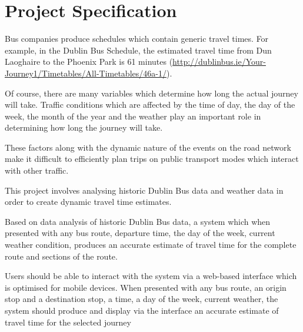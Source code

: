 \documentclass[]{UCD_CS_47360_Report}
\begin{document}
\maketitle


\chapter*{Project Specification}


Bus companies produce schedules which contain generic travel times. For example, in the Dublin Bus Schedule, the estimated travel time from Dun Laoghaire to the Phoenix Park is 61 minutes (\href{http://dublinbus.ie/Your-Journey1/Timetables/All-Timetables/46a-1/}{http://dublinbus.ie/Your-Journey1/Timetables/All-Timetables/46a-1/}).

Of course, there are many variables which determine how long the actual journey will take. Traffic conditions which are affected by the time of day, the day of the week, the month of the year and the weather play an important role in determining how long the journey will take. 

These factors along with the dynamic nature of the events on the road network make it difficult to efficiently plan trips on public transport modes which interact with other traffic. 

This project involves analysing historic Dublin Bus data and weather data in order to create dynamic travel time estimates. 

Based on data analysis of historic Dublin Bus data, a system which when presented with any bus route, departure time, the day of the week, current weather condition, produces an accurate estimate of travel time for the complete route and sections of the route. 

Users should be able to interact with the system via a web-based interface which is optimised for mobile devices. When presented with any bus route, an origin stop and a destination stop, a time, a day of the week, current weather, the system should produce and display via the interface an accurate estimate of travel time for the selected journey

\end{document}

